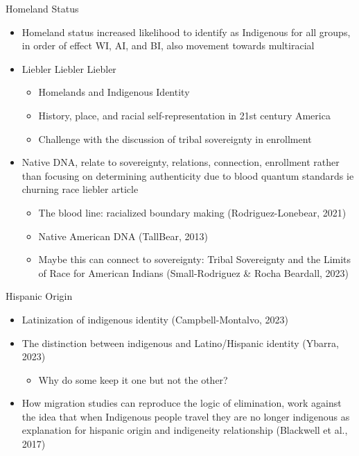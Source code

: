 \documentclass[
  12pt,
  letterpaper,
]{article}
\providecommand{\tightlist}{%
  \setlength{\itemsep}{0pt}\setlength{\parskip}{0pt}}\usepackage{longtable,booktabs,array}
\begin{document}
Homeland Status

\begin{itemize}
\item
  Homeland status increased likelihood to identify as Indigenous for all
  groups, in order of effect WI, AI, and BI, also movement towards
  multiracial
\item
  Liebler Liebler Liebler

  \begin{itemize}
  \item
    Homelands and Indigenous Identity
  \item
    History, place, and racial self-representation in 21st century
    America
  \item
    Challenge with the discussion of tribal sovereignty in enrollment
  \end{itemize}
\item
  Native DNA, relate to sovereignty, relations, connection, enrollment
  rather than focusing on determining authenticity due to blood quantum
  standards ie churning race liebler article

  \begin{itemize}
  \item
    The blood line: racialized boundary making (Rodriguez-Lonebear,
    2021)
  \item
    Native American DNA (TallBear, 2013)
  \item
    Maybe this can connect to sovereignty: Tribal Sovereignty and the
    Limits of Race for American Indians (Small-Rodriguez \& Rocha
    Beardall, 2023)
  \end{itemize}
\end{itemize}

Hispanic Origin

\begin{itemize}
\item
  Latinization of indigenous identity (Campbell-Montalvo, 2023)
\item
  The distinction between indigenous and Latino/Hispanic identity
  (Ybarra, 2023)

  \begin{itemize}
  \tightlist
  \item
    Why do some keep it one but not the other?
  \end{itemize}
\item
  How migration studies can reproduce the logic of elimination, work
  against the idea that when Indigenous people travel they are no longer
  indigenous as explanation for hispanic origin and indigeneity
  relationship (Blackwell et al., 2017)
\end{itemize}
\end{document}
